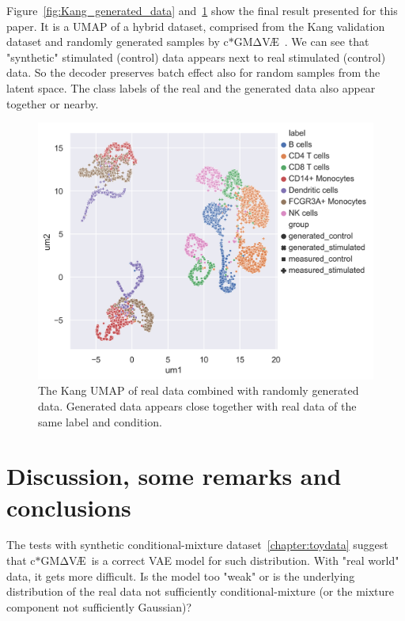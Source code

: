 \documentclass[11pt, a4paper]{report}
\theoremstyle{plain}
\theoremstyle{definition}
\theoremstyle{remark}
\newcommand{\gmvae}{c$\ast$GM$\mathrm{\Delta}$V\AE~}
\begin{document}
Figure~\ref{fig:Kang_generated_data} and~\ref{fig:Kang_generated_data_sns} show
the final result presented for this paper. It is a UMAP of a hybrid dataset,
comprised from the Kang validation dataset and randomly generated samples by
\gmvae. We can see that "synthetic" stimulated (control) data appears next to
real stimulated (control) data. So the decoder preserves batch effect also for
random samples from the latent space. The class labels of the real and the
generated data also appear together or nearby.

\begin{figure}[h]
\centering
\includegraphics[width=1.15\textwidth]{images/Kang_generated_data_sns.png}
\caption{
The Kang UMAP of real data combined with randomly generated data. Generated data
appears close together with real data of the same label and condition.
}
\label{fig:Kang_generated_data_sns}
\end{figure}





\chapter{Discussion, some remarks and conclusions}

The tests with synthetic conditional-mixture dataset~\ref{chapter:toydata}
suggest that \gmvae is a correct VAE model for such distribution.
With "real world" data, it gets more difficult. Is the model too "weak" or
is the underlying distribution of the real data not sufficiently
conditional-mixture (or the mixture component not sufficiently Gaussian)? 
\end{document}
